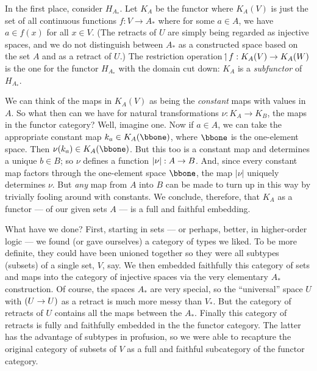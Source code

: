 In the first place, consider $H_{A_*}$. Let $K_A$ be the functor where $K_A(V)$ is just
the set of all continuous functions $f: V\to A_*$ where for some $a \in A$, we have $a \in
f(x)$ for all $x \in V$. (The retracts of $U$ are simply being regarded as injective
spaces, and we do not distinguish between $A_*$ as a constructed space based on the set
$A$ and as a retract of $U$.) The restriction operation $\!\upharpoonleft\! f : K_A(V)\rightarrow K_A(W)$ is the
one for the functor $H_{A_*}$ with the domain cut down: $K_A$ is a {\it subfunctor} of
$H_{A_*}$.

We can think of the maps in $K_A(V)$ as being the {\it constant} maps with values in $A$.
So what then can we have for natural transformations $\nu: K_A \to K_B$, the maps in the
functor category? Well, imagine one. Now if $a \in A$, we can take the appropriate
constant map $k_a \in K_A(\bbone)$, where $\bbone$ is the one-element space. Then
$\nu(k_a) \in K_A(\bbone)$. But this too is a constant map and determines a unique $b \in
B$; so $\nu$ defines a function $|\nu| : A \rightarrow B$. And, since every constant map factors
through the one-element space $\bbone$, the map $|\nu|$ uniquely determines $\nu$. But
{\it any} map from $A$ into $B$ can be made to turn up in this way by trivially fooling
around with constants. We conclude, therefore, that $K_A$ as a functor --- of our given
sets $A$ --- is a full and faithful embedding.

What have we done? First, starting in sets --- or perhaps, better, in higher-order logic
--- we found (or gave ourselves) a category of types we liked. To be more definite, they
could have been unioned together so they were all subtypes (subsets) of a single set, $V$,
say. We then embedded faithfully this category of sets and maps into the category of
injective spaces via the very elementary $A_*$ construction. Of course, the spaces $A_*$
are very special, so the ``universal'' space $U$ with $(U\rightarrow U)$ as a retract is much more
messy than $V_*$. But the category of retracts of $U$ contains all the maps between the
$A_*$. Finally this category of retracts is fully and faithfully embedded in the the
functor category. The latter has the advantage of subtypes in profusion, so we were able
to recapture the original category of subsets of $V$ as a full and faithful subcategory of
the functor category.

